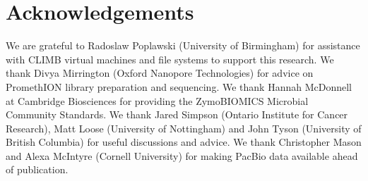 \documentclass[a4paper,num-refs]{oup-contemporary}
\begin{document}
\section{Acknowledgements}

We are grateful to Radoslaw Poplawski (University of Birmingham) for assistance with CLIMB virtual machines and file systems to support this research. We thank Divya Mirrington (Oxford Nanopore Technologies) for advice on PromethION library preparation and sequencing. We thank Hannah McDonnell at Cambridge Biosciences for providing the ZymoBIOMICS Microbial Community Standards. We thank Jared Simpson (Ontario Institute for Cancer Research), Matt Loose (University of Nottingham) and John Tyson (University of British Columbia) for useful discussions and advice. We thank Christopher Mason and Alexa McIntyre (Cornell University) for making PacBio data available ahead of publication.





\end{document}
